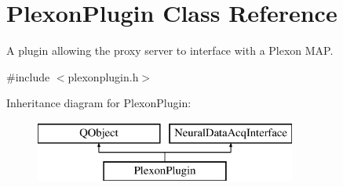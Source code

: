 \hypertarget{class_plexon_plugin}{\section{Plexon\-Plugin Class Reference}
\label{class_plexon_plugin}
}


A plugin allowing the proxy server to interface with a Plexon M\-A\-P.  




{\ttfamily \#include $<$plexonplugin.\-h$>$}

Inheritance diagram for Plexon\-Plugin\-:\begin{figure}[H]
\begin{center}
\leavevmode
\includegraphics[height=2.000000cm]{class_plexon_plugin}
\end{center}
\end{figure}

